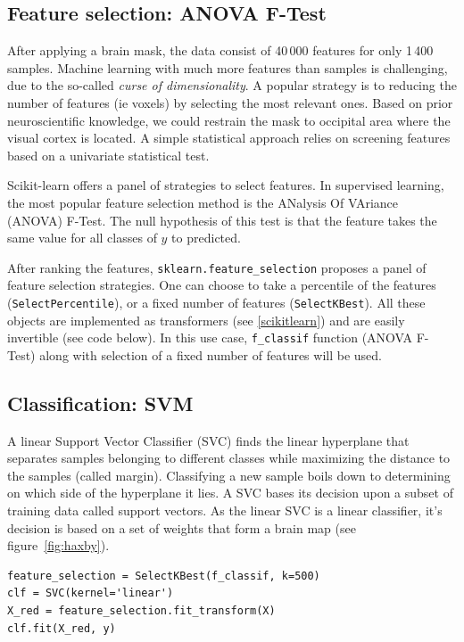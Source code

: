 \documentclass{frontiersSCNS} %
\begin{document}
\subsection{Feature selection: ANOVA F-Test}

After applying a brain mask, the data consist of 40\,000 features for 
only 1\,400 samples. Machine learning with much more features than samples
is challenging, due to the so-called \emph{curse of dimensionality}.
A popular strategy is to reducing the number of features (ie voxels) by
selecting the most relevant ones. Based on prior neuroscientific
knowledge, we could restrain the mask to occipital area where the visual
cortex is located. A simple statistical approach relies on screening
features based on a univariate statistical test.

Scikit-learn offers a panel of strategies to select features. In supervised
learning, the most popular feature selection method is the
ANalysis Of VAriance (ANOVA) F-Test. 
The null hypothesis of this test is that the feature takes the same value
for all classes of $y$ to predicted.

After ranking the features, \verb!sklearn.feature_selection! proposes a panel
of feature selection strategies. One can choose to take a percentile of the features
(\verb!SelectPercentile!), or a fixed number of features (\verb!SelectKBest!).
All these objects are implemented as transformers (see
\ref{scikitlearn}) and are easily invertible (see code below).
In this use case, \verb!f_classif! function (ANOVA F-Test) along with selection
of a fixed number of features will be used.

\subsection{Classification: SVM}

A linear Support Vector Classifier (SVC) finds the linear hyperplane that
separates samples belonging to different classes while maximizing the
distance to the samples (called margin). Classifying a new sample boils
down to determining on which side of the hyperplane it lies. A SVC bases
its decision upon a subset of training data called support vectors. As
the linear SVC is a linear classifier, it's decision is based on a set of
weights that form a brain map (see figure~\ref{fig:haxby}).

\begin{lstlisting}
feature_selection = SelectKBest(f_classif, k=500)
clf = SVC(kernel='linear')
X_red = feature_selection.fit_transform(X)
clf.fit(X_red, y)
\end{lstlisting}
\end{document}
